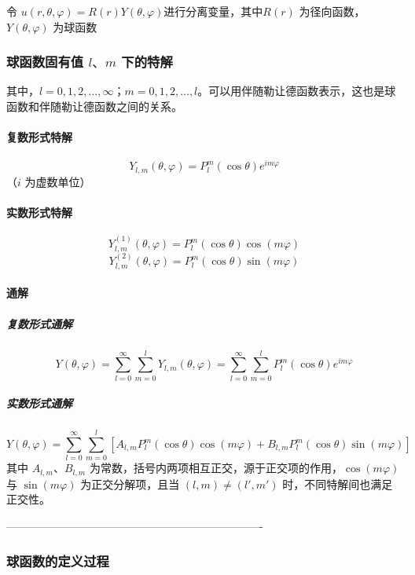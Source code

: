 \documentclass{article}
\begin{document}
				
					令 \( u(r, \theta, \varphi) = R(r) Y(\theta, \varphi) \)进行分离变量，其中\( R(r) \) 为径向函数，\( Y(\theta, \varphi) \) 为球函数
				
				
				\subsubsection{球函数固有值 \( l、m \) 下的特解}
				其中，\( l = 0, 1, 2, \dots, \infty \)；\( m = 0, 1, 2, \dots, l \)。可以用伴随勒让德函数表示，这也是球函数和伴随勒让德函数之间的关系。
				
				\paragraph{复数形式特解}
				\[
				Y_{l,m}(\theta, \varphi) = P_l^m(\cos\theta) e^{i m \varphi}
				\]
				（\( i \) 为虚数单位）
				
				\paragraph{实数形式特解}
				\[
				Y_{l,m}^{(1)}(\theta, \varphi) = P_l^m(\cos\theta) \cos(m\varphi)
				\]
				\[
				Y_{l,m}^{(2)}(\theta, \varphi) = P_l^m(\cos\theta) \sin(m\varphi)
				\]
				

	\paragraph{通解}
	
	\subparagraph{复数形式通解}
	\[
	Y(\theta, \varphi) = \sum_{l=0}^{\infty} \sum_{m=0}^{l} Y_{l,m}(\theta, \varphi) = \sum_{l=0}^{\infty} \sum_{m=0}^{l} P_l^m(\cos\theta) e^{i m \varphi}
	\]
	
	\subparagraph{实数形式通解}
	\[
	Y(\theta, \varphi) = \sum_{l=0}^{\infty} \sum_{m=0}^{l} \left[ A_{l,m} P_l^m(\cos\theta) \cos(m\varphi) + B_{l,m} P_l^m(\cos\theta) \sin(m\varphi) \right]
	\]
	其中 \( A_{l,m}、B_{l,m} \) 为常数，括号内两项相互正交，源于正交项的作用，\( \cos(m\varphi) \) 与 \( \sin(m\varphi) \) 为正交分解项，且当 \( (l,m) \neq (l',m') \) 时，不同特解间也满足正交性。
					
	
	----------------------------------------------------------------------
	
	

\fi 

	
	\subsubsection{球函数的定义过程}
	
\end{document}
